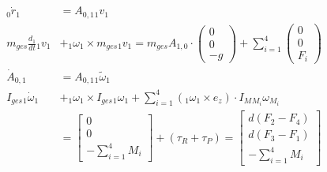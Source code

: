 \begin{align}
    {_{0}\dot{r}_{1}} &= A_{0, 1} {_{1}v_{1}} \\
    m_{ges} \frac{d_1}{dt} {_{1}v_{1}} &+ {_{1}\omega_{1}} \times m_{ges} {_{1}v_{1}} = m_{ges} A_{1, 0} \cdot \begin{pmatrix} 0 \\ 0 \\ -g \end{pmatrix} + \sum_{i = 1}^4 {\begin{pmatrix} 0 \\ 0 \\ F_i \end{pmatrix}} \\
    {{\dot{A}_{0, 1}}} &= {A_{0, 1}} \tilde{_{1} {\omega}_{1}}\\
    I_{ges} {_{1} \dot{\omega}_{1}} &+ {_{1} {\omega}_{1}} \times I_{ges} {_{1} {\omega}_{1}} + \sum_{i=1}^{4}{({_{1}{\omega}_{1}} \times e_z) \cdot I_{M} {_{M_i}\omega_{M_i}} } \\
    &= \begin{bmatrix} 0 \\ 0 \\ -\sum_{i = 1}^{4}{M_i} \end{bmatrix} + (\tau_{R} + \tau_{P}) = \begin{bmatrix} d(F_2 - F_4) \\ d(F_3 - F_1) \\ -\sum_{i = 1}^{4}{M_i} \end{bmatrix}
\end{align}

